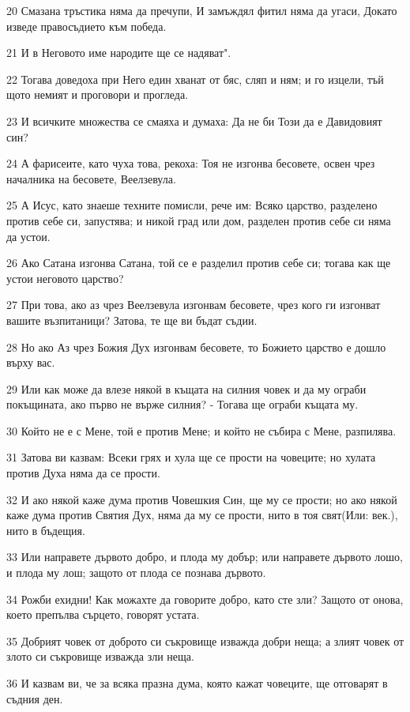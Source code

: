 \par 20 Смазана тръстика няма да пречупи, И замъждял фитил няма да угаси, Докато изведе правосъдието към победа.
\par 21 И в Неговото име народите ще се надяват".
\par 22 Тогава доведоха при Него един хванат от бяс, сляп и ням; и го изцели, тъй щото немият и проговори и прогледа.
\par 23 И всичките множества се смаяха и думаха: Да не би Този да е Давидовият син?
\par 24 А фарисеите, като чуха това, рекоха: Тоя не изгонва бесовете, освен чрез началника на бесовете, Веелзевула.
\par 25 А Исус, като знаеше техните помисли, рече им: Всяко царство, разделено против себе си, запустява; и никой град или дом, разделен против себе си няма да устои.
\par 26 Ако Сатана изгонва Сатана, той се е разделил против себе си; тогава как ще устои неговото царство?
\par 27 При това, ако аз чрез Веелзевула изгонвам бесовете, чрез кого ги изгонват вашите възпитаници? Затова, те ще ви бъдат съдии.
\par 28 Но ако Аз чрез Божия Дух изгонвам бесовете, то Божието царство е дошло върху вас.
\par 29 Или как може да влезе някой в къщата на силния човек и да му ограби покъщината, ако първо не върже силния? - Тогава ще ограби къщата му.
\par 30 Който не е с Мене, той е против Мене; и който не събира с Мене, разпилява.
\par 31 Затова ви казвам: Всеки грях и хула ще се прости на човеците; но хулата против Духа няма да се прости.
\par 32 И ако някой каже дума против Човешкия Син, ще му се прости; но ако някой каже дума против Святия Дух, няма да му се прости, нито в тоя свят(Или: век.), нито в бъдещия.
\par 33 Или направете дървото добро, и плода му добър; или направете дървото лошо, и плода му лош; защото от плода се познава дървото.
\par 34 Рожби ехидни! Как можахте да говорите добро, като сте зли? Защото от онова, което препълва сърцето, говорят устата.
\par 35 Добрият човек от доброто си съкровище изважда добри неща; а злият човек от злото си съкровище изважда зли неща.
\par 36 И казвам ви, че за всяка празна дума, която кажат човеците, ще отговарят в съдния ден.
